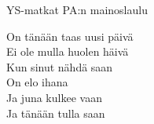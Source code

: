 \begin{song}{YS-matkat PA:n mainoslaulu}

    On tänään taas uusi päivä\\
    Ei ole mulla huolen häivä\\
    Kun sinut nähdä saan\\
    On elo ihana\\
    Ja juna kulkee vaan\\
    Ja tänään tulla saan

\end{song}